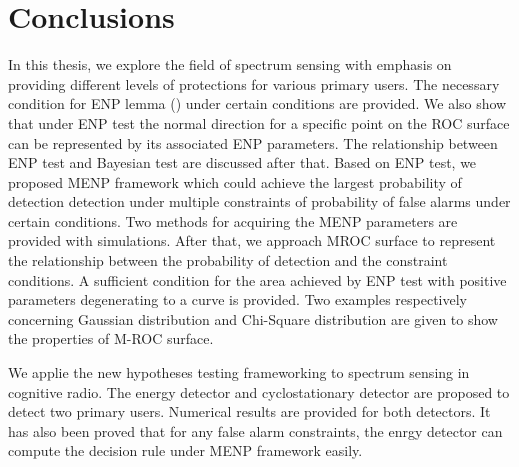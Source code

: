 \chapter{Conclusions}
In this thesis, we explore the field of spectrum sensing with emphasis on providing different levels of protections for various primary users. The necessary condition for ENP lemma () under certain conditions are provided. We also show that under ENP test the normal direction for a specific point on the ROC surface can be represented by its associated ENP parameters. The relationship between ENP test and Bayesian test are discussed after that. Based on ENP test, we proposed MENP framework which could achieve the largest probability of detection detection under multiple constraints of probability of false alarms under certain conditions. Two methods for acquiring the MENP parameters are provided with simulations. 
After that, we approach MROC surface to represent the relationship between the probability of detection and the constraint conditions.  A sufficient condition for the area achieved by ENP test with positive parameters degenerating to a curve is provided.  Two examples respectively concerning Gaussian distribution and Chi-Square distribution are given to show the properties of M-ROC surface.

We applie the new hypotheses testing frameworking to spectrum sensing in cognitive radio. The energy detector and cyclostationary detector are proposed to detect two primary users. Numerical results are provided for both detectors. It has also been proved that for any false alarm constraints, the enrgy detector can compute the decision rule under MENP framework easily. 
